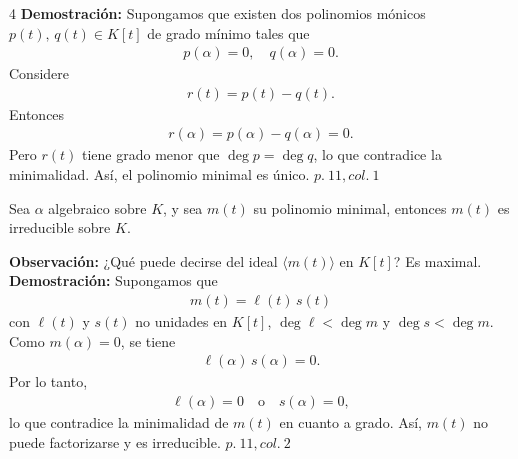 \documentclass[landscape,a4paper]{article}
\begin{document}
\begin{multicols}{4}
\noindent \textbf{Demostración:} Supongamos que existen dos polinomios mónicos $p(t), \,q(t) \in K[t]$ de grado mínimo tales que 
\begin{align*}
p(\alpha) = 0, \quad q(\alpha) = 0.
\end{align*}
Considere 
\begin{align*}
r(t) = p(t) - q(t).
\end{align*}
Entonces 
\begin{align*}
r(\alpha) = p(\alpha) - q(\alpha) = 0.
\end{align*}
Pero $r(t)$ tiene grado menor que $\deg p = \deg q$, lo que contradice la minimalidad. Así, el polinomio minimal es único. \(p.~11, col.~1\)\\


\begin{tcolorbox}[colback=white,colframe=red!80!black,colbacktitle=red!80!black,coltitle=white,title={Proposición: Irreducibilidad del polinomio minimal (p.~11, col.~2)}]
Sea $\alpha$ algebraico sobre $K$, y sea $m(t)$ su polinomio minimal, entonces $m(t)$ es irreducible sobre $K$.
\end{tcolorbox}

\noindent \textbf{Observación:} ¿Qué puede decirse del ideal $\langle m(t) \rangle$ en $K[t]$? Es maximal.\\

\noindent \textbf{Demostración:} Supongamos que
\begin{align*}
m(t) = \ell(t)\,s(t)
\end{align*}
con $\ell(t)$ y $s(t)$ no unidades en $K[t]$, $\deg \ell < \deg m$ y $\deg s < \deg m$. Como $m(\alpha) = 0$, se tiene
\begin{align*}
\ell(\alpha)\,s(\alpha) = 0.
\end{align*}
Por lo tanto,
\begin{align*}
\ell(\alpha) = 0 \quad \text{o} \quad s(\alpha) = 0,
\end{align*}
lo que contradice la minimalidad de $m(t)$ en cuanto a grado. Así, $m(t)$ no puede factorizarse y es irreducible. \(p.~11, col.~2\)\\

\end{multicols}
\end{document}

